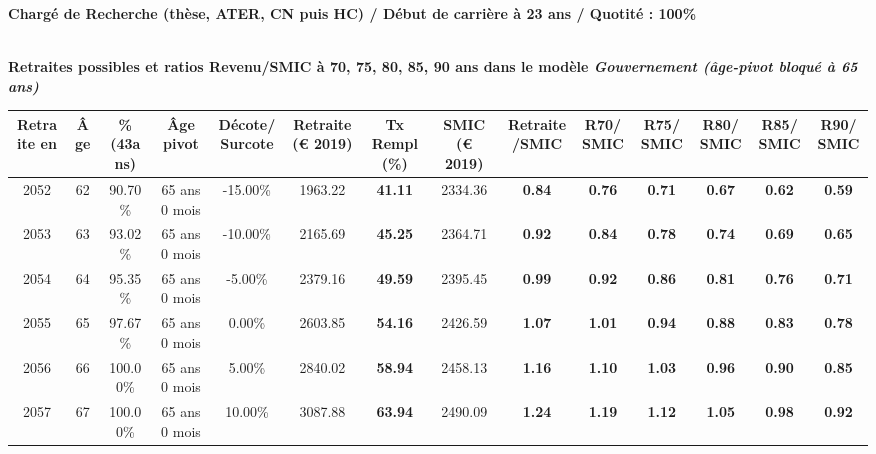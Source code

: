 {\bf \noindent Chargé de Recherche (thèse, ATER, CN puis HC) / Début de carrière à 23 ans / Quotité : 100\%}  ~ 

 ~\\{\bf \noindent Retraites possibles et ratios Revenu/SMIC à 70, 75, 80, 85, 90 ans dans le modèle \emph{Gouvernement (âge-pivot bloqué à 65 ans)}}  
 
\begin{adjustbox}{max width=\textwidth} 
\begin{tabular}[htb]{|c|c||c|c|c||c|c||c|c||c|c|c|c|c|} 
\hline 
 Retraite en &  Âge &  \%(43ans) &  Âge pivot &  Décote/Surcote &  Retraite (\euro{} 2019) &  Tx Rempl(\%) &  SMIC (\euro{} 2019) &  Retraite/SMIC &  R70/SMIC &  R75/SMIC &  R80/SMIC &  R85/SMIC &  R90/SMIC \\ 
\hline \hline 
 2052 &  62 &  90.70\% &  65 ans 0 mois &  -15.00\% &  1963.22 &  {\bf 41.11} &  2334.36 &  {\bf {\color{red} 0.84}} &  {\bf {\color{red} 0.76}} &  {\bf {\color{red} 0.71}} &  {\bf {\color{red} 0.67}} &  {\bf {\color{red} 0.62}} &  {\bf {\color{red} 0.59}} \\ 
\hline 
 2053 &  63 &  93.02\% &  65 ans 0 mois &  -10.00\% &  2165.69 &  {\bf 45.25} &  2364.71 &  {\bf {\color{red} 0.92}} &  {\bf {\color{red} 0.84}} &  {\bf {\color{red} 0.78}} &  {\bf {\color{red} 0.74}} &  {\bf {\color{red} 0.69}} &  {\bf {\color{red} 0.65}} \\ 
\hline 
 2054 &  64 &  95.35\% &  65 ans 0 mois &  -5.00\% &  2379.16 &  {\bf 49.59} &  2395.45 &  {\bf {\color{red} 0.99}} &  {\bf {\color{red} 0.92}} &  {\bf {\color{red} 0.86}} &  {\bf {\color{red} 0.81}} &  {\bf {\color{red} 0.76}} &  {\bf {\color{red} 0.71}} \\ 
\hline 
 2055 &  65 &  97.67\% &  65 ans 0 mois &  0.00\% &  2603.85 &  {\bf 54.16} &  2426.59 &  {\bf 1.07} &  {\bf 1.01} &  {\bf {\color{red} 0.94}} &  {\bf {\color{red} 0.88}} &  {\bf {\color{red} 0.83}} &  {\bf {\color{red} 0.78}} \\ 
\hline 
 2056 &  66 &  100.00\% &  65 ans 0 mois &  5.00\% &  2840.02 &  {\bf 58.94} &  2458.13 &  {\bf 1.16} &  {\bf 1.10} &  {\bf 1.03} &  {\bf {\color{red} 0.96}} &  {\bf {\color{red} 0.90}} &  {\bf {\color{red} 0.85}} \\ 
\hline 
 2057 &  67 &  100.00\% &  65 ans 0 mois &  10.00\% &  3087.88 &  {\bf 63.94} &  2490.09 &  {\bf 1.24} &  {\bf 1.19} &  {\bf 1.12} &  {\bf 1.05} &  {\bf {\color{red} 0.98}} &  {\bf {\color{red} 0.92}} \\ 
\hline 
\hline 
\end{tabular} 
\end{adjustbox} 
 
